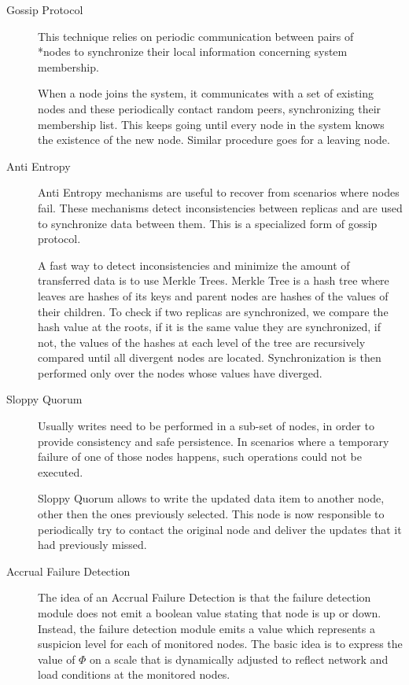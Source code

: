 \begin{description}
\item[Gossip Protocol] This technique relies on periodic communication between pairs of \\*nodes to synchronize their local information concerning system membership.\par
	When a node joins the system, it communicates with a set of existing nodes and these periodically contact random peers, synchronizing their membership list. This keeps going until every node in the system knows the existence of the new node. Similar procedure goes for a leaving node.
	
\item[Anti Entropy] Anti Entropy mechanisms are useful to recover from scenarios where nodes fail. These mechanisms detect inconsistencies between replicas and are used to synchronize data between them. This is a specialized form of gossip protocol.\par
	A fast way to detect inconsistencies and minimize the amount of transferred data is to use Merkle Trees\cite{merkle}. Merkle Tree is a hash tree where leaves are hashes of its keys and parent nodes are hashes of the values of their children. To check if two replicas are synchronized, we compare the hash value at the roots, if it is the same value they are synchronized, if not, the values of the hashes at each level of the tree are recursively compared until all divergent nodes are located. Synchronization is then performed only over the nodes whose values have diverged.
	
\item[Sloppy Quorum] Usually writes need to be performed in a sub-set of nodes, in order to provide consistency and safe persistence. In scenarios where a temporary failure of one of those nodes happens, such operations could not be executed.\par
	Sloppy Quorum allows to write the updated data item to another node, other then the ones previously selected. This node is now responsible to periodically try to contact the original node and deliver the updates that it had previously missed.
	
\item[Accrual Failure Detection]\cite{accrual} The idea of an Accrual Failure Detection is that the failure detection module does not emit a boolean value stating that node is up or down. Instead, the failure detection module emits a value which represents a suspicion level for each of monitored nodes. The basic idea is to express the value of $\Phi$ on a scale that is dynamically adjusted to reflect network and load conditions at the monitored nodes.
\end{description}

